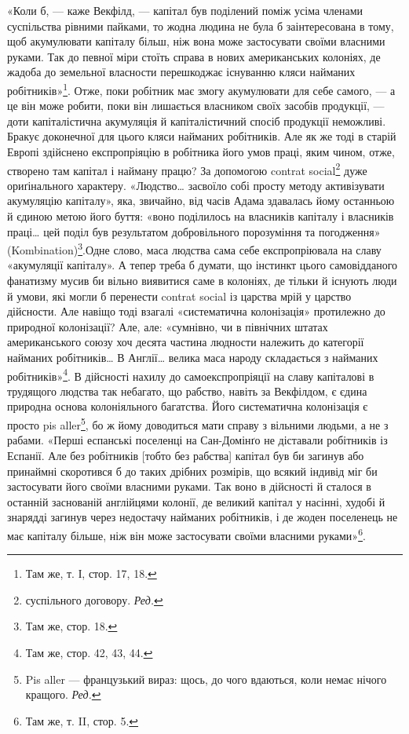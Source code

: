 «Коли б, — каже Векфілд, — капітал був поділений поміж усіма членами суспільства рівними пайками, то
жодна людина не була б заінтересована в тому, щоб акумулювати капіталу більш, ніж вона може
застосувати своїми власними руками. Так до певної міри стоїть справа в нових американських колоніях,
де жадоба до земельної власности перешкоджає існуванню кляси найманих робітників»\footnote{Там же, т. І, стор. 17, 18.
}. Отже, поки
робітник має змогу акумулювати для себе самого, — а це він може робити, поки він лишається власником
своїх засобів продукції, — доти капіталістична акумуляція й капіталістичний спосіб продукції
неможливі. Бракує доконечної для цього кляси найманих робітників. Але як же тоді в старій Европі
здійснено експропріяцію в робітника його умов праці, яким чином, отже, створено там капітал і
найману працю? За допомогою contrat social\footnote*{ суспільного договору. \emph{Ред.}} дуже ориґінального характеру. «Людство\dots{} засвоїло собі
просту методу активізувати акумуляцію капіталу», яка, звичайно, від часів Адама здавалась йому
останньою й єдиною метою його буття: «воно поділилось на власників капіталу і власників праці\dots{} цей
поділ був результатом добровільного порозуміння та погодження» (Kombination)\footnote{Там же, стор. 18.}.Одне слово, маса
людства сама себе експропріювала на славу «акумуляції капіталу». А тепер треба б думати, що інстинкт
цього самовідданого фанатизму мусив би вільно виявитися саме в колоніях, де тільки й існують люди й
умови, які могли б перенести contrat
social із царства мрій у царство дійсности. Але навіщо тоді взагалі «систематична колонізація»
протилежно до природної колонізації? Але, але: «сумнівно, чи в північних штатах американського союзу
хоч десята частина людности належить до категорії найманих робітників\dots{} В Англії\dots{} велика маса
народу складається з найманих робітників»\footnote{
Там же, стор. 42, 43, 44.
}. В дійсності нахилу до самоекспропріяції на славу
капіталові в трудящого людства так небагато, що рабство, навіть за Векфілдом, є єдина природна
основа колоніяльного багатства. Його систематична колонізація є просто pis aller\footnote*{
Pis aller — французький вираз: щось, до чого вдаються, коли немає нічого кращого. \emph{Ред.}
}, бо ж йому
доводиться мати справу з вільними людьми, а не з рабами. «Перші еспанські поселенці на Сан-Домінґо
не діставали робітників із Еспанії. Але без робітників [тобто без рабства] капітал був би загинув
або принаймні скоротився б до таких дрібних розмірів, що всякий індивід міг би застосувати його
своїми власними руками. Так воно в дійсності й сталося в останній заснованій англійцями колонії, де
великий капітал у насінні, худобі й знарядді загинув через недостачу найманих робітників, і де жоден
поселенець не має капіталу більше, ніж він може застосувати своїми власними руками»\footnote{
Там же, т. II, стор. 5.
}.

